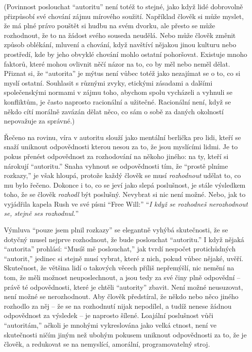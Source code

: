 \documentclass{book}
\begin{document}
(Povinnost poslouchat \enquote{autoritu} není totéž to stejné, jako když lidé dobrovolně přizpůsobí své chování zájmu mírového soužití. Například člověk si může myslet, že má plné právo pouštět si hudbu na svém dvorku, ale přesto se může rozhodnout, že to na žádost svého souseda neudělá. Nebo může člověk změnit způsob oblékání, mluvení a chování, když navštíví nějakou jinou kulturu nebo prostředí, kde by jeho obvyklé chování mohlo ostatní pohoršovat. Existuje mnoho faktorů, které mohou ovlivnit něčí názor na to, co by měl nebo neměl dělat. Přiznat si, že \enquote{autorita} je mýtus není vůbec totéž jako nezajímat se o to, co si myslí ostatní. Souhlasit s různými zvyky, etickými zásadami a dalšími společenskými normami v zájmu toho, abychom spolu vycházeli a vyhnuli se konfliktům, je často naprosto racionální a užitečné. Racionální není, když se někdo cítí morálně zavázán dělat něco, co sám o sobě za daných okolností nepovažuje za správné.)

Řečeno na rovinu, víra v autoritu slouží jako mentální berlička pro lidi, kteří se snaží uniknout odpovědnosti kterou nesou za to, že jsou myslícími lidmi. Je to pokus přenést odpovědnost za rozhodování na někoho jiného: na ty, kteří si nárokují \enquote{autoritu.} Snaha vyhnout se odpovědnosti tím, že \enquote{prostě plníme rozkazy,} je však hloupá, protože každý člověk se musí \emph{rozhodnout} udělat to, co mu bylo řečeno. Dokonce i to, co se jeví jako slepá poslušnost, je stále výsledkem toho, že se člověk \emph{rozhodl} být poslušný. Nevybrat si nic není možné. Nebo, jak to vyjádřila kapela Rush ve své písni \enquote{Free Will:} \enquote{\emph{I když se rozhodneš nerozhodnout se, stejně ses rozhodnul.}}

Výmluva \enquote{pouze jsem plnil rozkazy} se elegantně vyhýbá skutečnosti, že se dotyčný musel nejprve rozhodnout, že bude poslouchat \enquote{autoritu.} I když nějaká \enquote{autorita} prohlásí: \enquote{Musíš mě poslouchat,} jak tvrdí nespočet protichůdných \enquote{autorit,} jedinec si stejně musí vybrat, které z nich, pokud vůbec nějaké, uvěří. Skutečnost, že většina lidí o takových věcech příliš nepřemýšlí, nic nemění na tom, že měli možnost neuposlechnout, a jsou tedy za své činy plně odpovědní -- právě té odpovědnosti, které je chtěli \enquote{autority} zbavit. Není možné neusuzovat, není možné se nerozhodnout. Aby člověk předstíral, že někdo nebo něco jiného rozhodlo za něj -- že se na rozhodnutí nijak nepodílel, a tudíž nenese žádnou odpovědnost za výsledek -- je naprosto šílené. Loajální poslušnost vůči \enquote{autoritám,} ačkoli je mnohými vykreslována jako velká ctnost, není ve skutečnosti ničím jiným než ubohým pokusem uniknout odpovědnosti za to, že je člověk, a redukovat se na nemyslící, amorální, programovatelný stroj.
\end{document}
